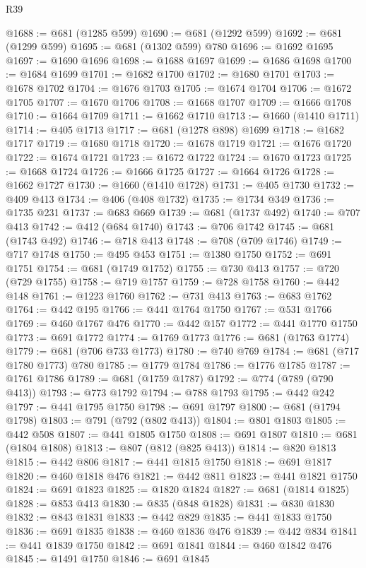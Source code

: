 \begin{lexlean}{R39}
\begin{coremodule}
@1688 := @681 (@1285 @599)
@1690 := @681 (@1292 @599)
@1692 := @681 (@1299 @599)
@1695 := @681 (@1302 @599) @780
@1696 := @1692 @1695
@1697 := @1690 @1696
@1698 := @1688 @1697
@1699 := @1686 @1698
@1700 := @1684 @1699
@1701 := @1682 @1700
@1702 := @1680 @1701
@1703 := @1678 @1702
@1704 := @1676 @1703
@1705 := @1674 @1704
@1706 := @1672 @1705
@1707 := @1670 @1706
@1708 := @1668 @1707
@1709 := @1666 @1708
@1710 := @1664 @1709
@1711 := @1662 @1710
@1713 := @1660 (@1410 @1711)
@1714 := @405 @1713
@1717 := @681 (@1278 @898) @1699
@1718 := @1682 @1717
@1719 := @1680 @1718
@1720 := @1678 @1719
@1721 := @1676 @1720
@1722 := @1674 @1721
@1723 := @1672 @1722
@1724 := @1670 @1723
@1725 := @1668 @1724
@1726 := @1666 @1725
@1727 := @1664 @1726
@1728 := @1662 @1727
@1730 := @1660 (@1410 @1728)
@1731 := @405 @1730
@1732 := @409 @413
@1734 := @406 (@408 @1732)
@1735 := @1734 @349
@1736 := @1735 @231
@1737 := @683 @669
@1739 := @681 (@1737 @492)
@1740 := @707 @413
@1742 := @412 (@684 @1740)
@1743 := @706 @1742
@1745 := @681 (@1743 @492)
@1746 := @718 @413
@1748 := @708 (@709 @1746)
@1749 := @717 @1748
@1750 := @495 @453
@1751 := @1380 @1750
@1752 := @691 @1751
@1754 := @681 (@1749 @1752)
@1755 := @730 @413
@1757 := @720 (@729 @1755)
@1758 := @719 @1757
@1759 := @728 @1758
@1760 := @442 @148
@1761 := @1223 @1760
@1762 := @731 @413
@1763 := @683 @1762
@1764 := @442 @195
@1766 := @441 @1764 @1750
@1767 := @531 @1766
@1769 := @460 @1767 @476
@1770 := @442 @157
@1772 := @441 @1770 @1750
@1773 := @691 @1772
@1774 := @1769 @1773
@1776 := @681 (@1763 @1774)
@1779 := @681 (@706 @733 @1773)
@1780 := @740 @769
@1784 := @681 (@717 @1780 @1773) @780
@1785 := @1779 @1784
@1786 := @1776 @1785
@1787 := @1761 @1786
@1789 := @681 (@1759 @1787)
@1792 := @774 (@789 (@790 @413))
@1793 := @773 @1792
@1794 := @788 @1793
@1795 := @442 @242
@1797 := @441 @1795 @1750
@1798 := @691 @1797
@1800 := @681 (@1794 @1798)
@1803 := @791 (@792 (@802 @413))
@1804 := @801 @1803
@1805 := @442 @508
@1807 := @441 @1805 @1750
@1808 := @691 @1807
@1810 := @681 (@1804 @1808)
@1813 := @807 (@812 (@825 @413))
@1814 := @820 @1813
@1815 := @442 @806
@1817 := @441 @1815 @1750
@1818 := @691 @1817
@1820 := @460 @1818 @476
@1821 := @442 @811
@1823 := @441 @1821 @1750
@1824 := @691 @1823
@1825 := @1820 @1824
@1827 := @681 (@1814 @1825)
@1828 := @853 @413
@1830 := @835 (@848 @1828)
@1831 := @830 @1830
@1832 := @843 @1831
@1833 := @442 @829
@1835 := @441 @1833 @1750
@1836 := @691 @1835
@1838 := @460 @1836 @476
@1839 := @442 @834
@1841 := @441 @1839 @1750
@1842 := @691 @1841
@1844 := @460 @1842 @476
@1845 := @1491 @1750
@1846 := @691 @1845

\end{coremodule}
\end{lexlean}
